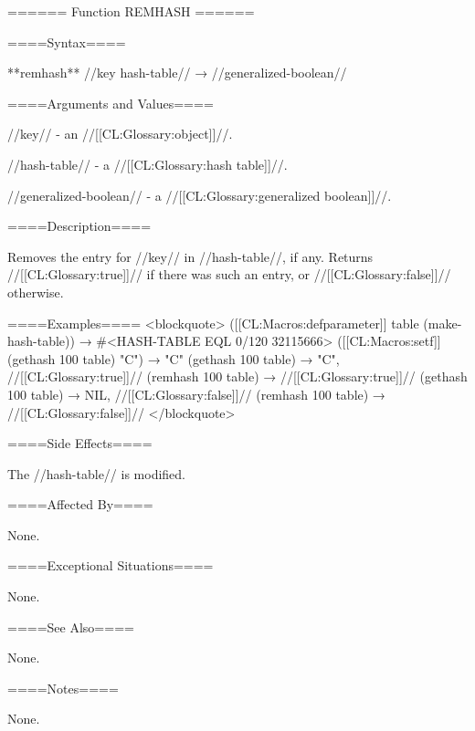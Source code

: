 ====== Function REMHASH ======

====Syntax====

**remhash** //key hash-table// → //generalized-boolean//

====Arguments and Values====

//key// - an //[[CL:Glossary:object]]//.

//hash-table// - a //[[CL:Glossary:hash table]]//.

//generalized-boolean// - a //[[CL:Glossary:generalized boolean]]//.

====Description====

Removes the entry for //key// in //hash-table//, if any. Returns //[[CL:Glossary:true]]// if there was such an entry, or //[[CL:Glossary:false]]// otherwise.

====Examples==== <blockquote> ([[CL:Macros:defparameter]] table (make-hash-table)) → #<HASH-TABLE EQL 0/120 32115666> ([[CL:Macros:setf]] (gethash 100 table) "C") → "C" (gethash 100 table) → "C", //[[CL:Glossary:true]]// (remhash 100 table) → //[[CL:Glossary:true]]// (gethash 100 table) → NIL, //[[CL:Glossary:false]]// (remhash 100 table) → //[[CL:Glossary:false]]// </blockquote>

====Side Effects====

The //hash-table// is modified.

====Affected By====

None.

====Exceptional Situations====

None.

====See Also====

None.

====Notes====

None.

